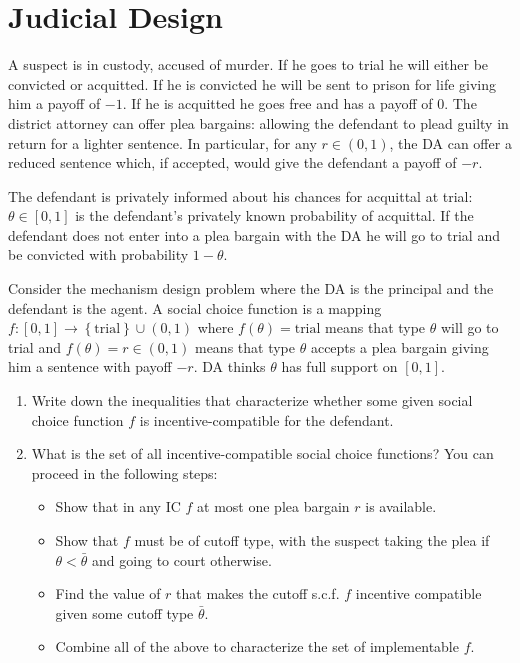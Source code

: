 \documentclass{article}
\newcommand{\enterProblemHeader}[1]{
\nobreak\extramarks{#1}{#1 continued on next page\ldots}\nobreak
\nobreak\extramarks{#1 (continued)}{#1 continued on next page\ldots}\nobreak
}
\newcommand{\exitProblemHeader}[1]{
\nobreak\extramarks{#1 (continued)}{#1 continued on next page\ldots}\nobreak
\nobreak\extramarks{#1}{}\nobreak
}
\newcounter{homeworkProblemCounter} %
\newcommand{\homeworkProblemName}{}
\newenvironment{ex}[1][Problem \arabic{homeworkProblemCounter}]{ %
\stepcounter{homeworkProblemCounter} %
\renewcommand{\homeworkProblemName}{#1} %
\section{\homeworkProblemName} %
}{
}
\begin{document}
\begin{ex}[Judicial Design]
	A suspect is in custody, accused of murder.  If he goes to trial he will either be convicted or acquitted. If he
is convicted he will be sent to prison for life giving him a payoff of $-1$.  If he is acquitted he goes free and has a
payoff of $0$.  The district attorney can offer plea bargains: allowing the defendant to plead guilty in return for a
lighter sentence.  In
particular, for any $r\in (0,1)$, the DA can offer a reduced sentence which, if accepted, would give the defendant
a payoff of $-r.$

	
	The defendant is privately informed about his chances for acquittal at trial:  $\theta\in [0,1]$ is the defendant's privately
known probability of acquittal.  If the defendant does not enter into a plea bargain with the DA he will go to trial and
be convicted with probability $1 - \theta$.

	
	Consider the mechanism design problem where the DA is the principal and the defendant is the agent.  A social choice
function is a mapping $f:[0,1] \rightarrow \left\{ \text{trial} \right\} \cup (0,1)$ where $f(\theta) = \text{trial}$ means
that type $\theta$ will go to trial and $f(\theta) = r \in (0,1)$ means that type $\theta$ accepts a plea bargain
giving him a sentence with payoff $-r$.
DA thinks $\theta$ has full support on $[0,1]$.
	
	\begin{enumerate}

		\item Write down the inequalities that characterize whether some given social choice function $f$ is incentive-compatible
for the defendant.

		\item What is the set of all incentive-compatible social choice functions?
You can proceed in the following steps:
		\begin{itemize}
			\item Show that in any IC $f$ at most one plea bargain $r$ is available.
			\item Show that $f$ must be of cutoff type, with the suspect taking the plea if $\theta < \bar{\theta}$ and going to court otherwise.
			\item Find the value of $r$ that makes the cutoff s.c.f. $f$ incentive compatible given some cutoff type $\bar{\theta}$.
			\item Combine all of the above to characterize the set of implementable $f$.
		\end{itemize}
	\end{enumerate}



\end{ex}
\end{document}

